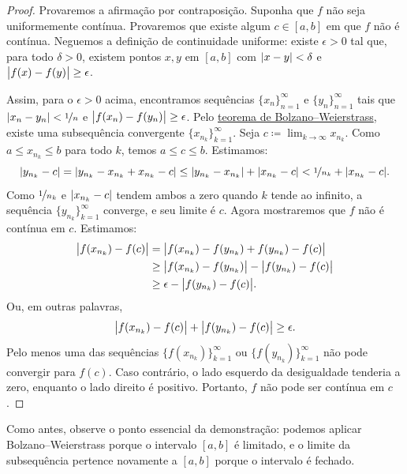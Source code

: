 \begin{proof}
Provaremos a afirmação por contraposição.
Suponha que $f$ não seja uniformemente contínua. Provaremos
que existe algum $c \in [a,b]$ em que $f$ não é contínua.
Neguemos a definição de continuidade uniforme:
existe $\epsilon > 0$
tal que, para todo $\delta > 0$, existem pontos $x,y$ em $[a,b]$ com
$\lvert {x-y} \rvert < \delta$ e $\bigl\lvert {f(x)-f(y)} \bigr\rvert \geq \epsilon$.

Assim, para o $\epsilon > 0$ acima,
encontramos sequências $\{ x_n \}_{n=1}^\infty$ e $\{ y_n \}_{n=1}^\infty$
tais que $\lvert {x_n-y_n} \rvert < \nicefrac{1}{n}$ e
$\bigl\lvert {f(x_n)-f(y_n)} \bigr\rvert \geq \epsilon$. Pelo
\hyperref[thm:bwseq]{teorema de Bolzano--Weierstrass},
existe uma subsequência convergente
$\{ x_{n_k} \}_{k=1}^\infty$. Seja
$c \coloneqq \lim_{k\to\infty} x_{n_k}$.
Como $a \leq x_{n_k} \leq b$ para todo $k$, temos $a \leq c \leq b$. Estimamos:
\begin{equation*}
\lvert {y_{n_k} - c} \rvert =
\lvert {y_{n_k} - x_{n_k} + x_{n_k} - c} \rvert \leq
\lvert {y_{n_k} - x_{n_k}} \rvert
+
\lvert {x_{n_k}-c} \rvert
<
\nicefrac{1}{n_k}
+
\lvert {x_{n_k}-c} \rvert .
\end{equation*}
Como $\nicefrac{1}{n_k}$ e $\lvert {x_{n_k}-c} \rvert$ tendem ambos a zero quando
$k$ tende ao infinito, a sequência $\{ y_{n_k} \}_{k=1}^\infty$ converge,
e seu limite é $c$. Agora mostraremos que $f$ não é contínua em $c$.
Estimamos:
\begin{equation*}
\begin{split}
\bigl\lvert {f(x_{n_k}) - f(c)} \bigr\rvert & =
\bigl\lvert {f(x_{n_k}) - f(y_{n_k}) + f(y_{n_k}) - f(c)} \bigr\rvert \\
& \geq
\bigl\lvert {f(x_{n_k}) - f(y_{n_k})} \bigr\rvert - \bigl\lvert {f(y_{n_k}) - f(c)} \bigr\rvert \\
& \geq
\epsilon - \bigl\lvert {f(y_{n_k})-f(c)} \bigr\rvert .
\end{split}
\end{equation*}
Ou, em outras palavras,
\begin{equation*}
\bigl\lvert {f(x_{n_k})-f(c)} \bigr\rvert
+
\bigl\lvert {f(y_{n_k})-f(c)} \bigr\rvert \geq
\epsilon .
\end{equation*}
Pelo menos uma das sequências $\bigl\{ f(x_{n_k}) \bigr\}_{k=1}^\infty$ ou
$\bigl\{ f(y_{n_k}) \bigr\}_{k=1}^\infty$ não pode convergir para $f(c)$.
Caso contrário, o lado esquerdo da desigualdade tenderia a zero, enquanto
o lado direito é positivo. Portanto, $f$ não pode ser contínua em $c$.
\end{proof}

Como antes, observe o ponto essencial da demonstração: podemos aplicar
Bolzano--Weierstrass porque o intervalo $[a,b]$ é limitado, e o limite da
subsequência pertence novamente a $[a,b]$ porque o intervalo é fechado.

